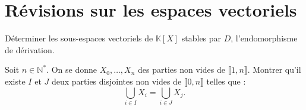\documentclass[french]{book}
\newcommand{\N}{\mathbb{N}}
\newcommand{\K}{\mathbb{K}}
\newcommand{\st}{^*}
\theoremstyle{definition}
\theoremstyle{remark}
\begin{document}
\chapter{Révisions sur les espaces vectoriels}

\begin{exo}[0]{}
	Déterminer les sous-espaces vectoriels de $\K[X]$ stables par $D$, l'endomorphisme de dérivation.
\end{exo}

\begin{exo}[2]{}
	Soit $n\in\N\st$. On se donne $X_0,\ldots,X_n$ des parties non vides de $\llbracket1,n\rrbracket$. Montrer qu'il existe $I$ et $J$ deux parties disjointes non vides de $\llbracket0,n\rrbracket$ telles que : $$\bigcup_{i\in I} X_i=\bigcup_{i\in J} X_j.$$
\end{exo}
\end{document}

